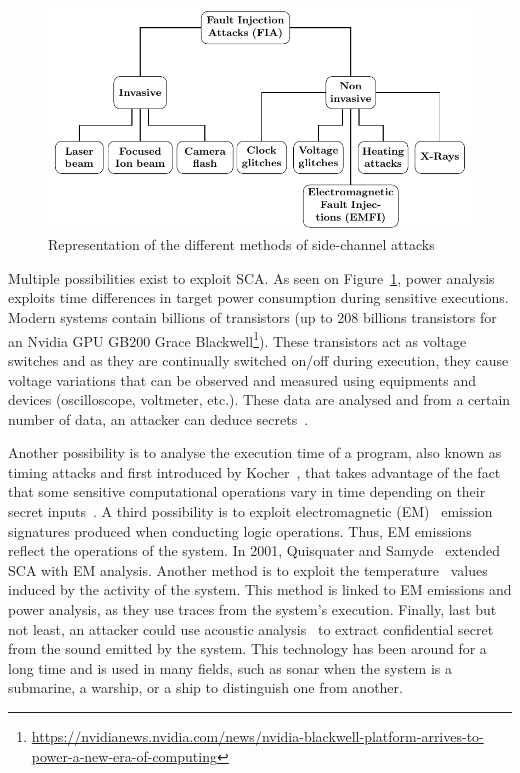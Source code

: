 \begin{figure}[ht]
    \centering
    \includegraphics[page=3, width=.75\textwidth]{c2_soa/img/physicalAttacks.pdf}
    \caption{Representation of the different methods of side-channel attacks}
    \label{fig:sca}
\end{figure}

Multiple possibilities exist to exploit SCA.
As seen on Figure~\ref{fig:sca}, power analysis exploits time differences in target power consumption during sensitive executions. Modern systems contain billions of transistors (up to 208 billions transistors for an Nvidia GPU GB200 Grace Blackwell\footnote{\hfill\url{https://nvidianews.nvidia.com/news/nvidia-blackwell-platform-arrives-to-power-a-new-era-of-computing}}).
These transistors act as voltage switches and as they are continually switched on/off during execution, they cause voltage variations that can be observed and measured using equipments and devices (oscilloscope, voltmeter, etc.). These data are analysed and from a certain number of data, an attacker can deduce secrets~\cite{KJJ-98-crypto,KJJR-11-jce,GP-99-ches,LKOSECG-21-sp}.

Another possibility is to analyse the execution time of a program, also known as timing attacks and first introduced by Kocher~\cite{K-96-crypto}, that takes advantage of the fact that some sensitive computational operations vary in time depending on their secret inputs~\cite{DD-05-compnet}.
A third possibility is to exploit electromagnetic (EM)~\cite{ANM-19-di,HMHSS-12-tcrypo,KSTO-17-iccad, WDL-16-ntms,HGTVJ-22-dt} emission signatures produced when conducting logic operations. Thus, EM emissions reflect the operations of the system. In 2001, Quisquater and Samyde~\cite{QS-01-scps} extended SCA with EM analysis.
Another method is to exploit the temperature~\cite{HS-14-cardis,AZRHT-21-tvlsi} values induced by the activity of the system. This method is linked to EM emissions and power analysis, as they use traces from the system's execution.
Finally, last but not least, an attacker could use acoustic analysis~\cite{BDGPS-10-usenix,GST-17-crypto,HTM-23-eurospw} to extract confidential secret from the sound emitted by the system. This technology has been around for a long time and is used in many fields, such as sonar when the system is a submarine, a warship, or a ship to distinguish one from another.

